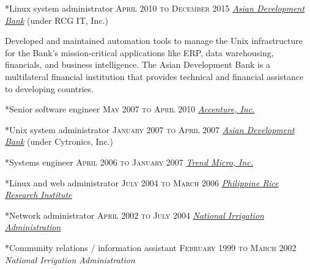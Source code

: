 \documentclass[10pt, a4paper, final]{article}
\begin{document}
\begin{minipage}[t]{0.65\linewidth}
\begin{section}
    \begin{subsection}*{Linux system administrator \hfill\textsc{April 2010 to December 2015}}
      \href{http://www.adb.org}{\textit{Asian Development Bank}} (under RCG IT, Inc.) 

      Developed and maintained automation tools to manage the Unix infrastructure for the Bank's mission-critical applications like ERP, data warehousing, financials, and business intelligence. The Asian Development Bank is a multilateral financial institution that provides technical and financial assistance to developing countries.
    \end{subsection}
    \vspace{1em}
  
    \begin{subsection}*{Senior software engineer \hfill\textsc{May 2007 to April 2010}}
      \href{http://www.accenture.com}{\textit{Accenture, Inc.}}  
    \end{subsection}
    \vspace{1em}
  
    \begin{subsection}*{Unix system administrator \hfill\textsc{January 2007 to April 2007}}
      \href{http://www.adb.org}{\textit{Asian Development Bank}} (under Cytronics, Inc.) 
    \end{subsection}
    \vspace{1em}
  
    \begin{subsection}*{Systems engineer \hfill\textsc{April 2006 to January 2007}}
      \href{http://www.trendmicro.com}{\textit{Trend Micro, Inc.}}  
    \end{subsection}
    \vspace{1em}
  
    \begin{subsection}*{Linux and web administrator \hfill\textsc{July 2004 to March 2006}}
      \href{http://www.philrice.gov.ph}{\textit{Philippine Rice Research Institute}}  
    \end{subsection}
    \vspace{1em}
  
    \begin{subsection}*{Network administrator \hfill\textsc{April 2002 to July 2004}}
      \href{http://www.nia.gov.ph}{\textit{National Irrigation Administration}}  
    \end{subsection}
    \vspace{1em}
  
    \begin{subsection}*{Community relations / information assistant \hfill\textsc{February 1999 to March 2002}}
      \textit{National Irrigation Administration} 
    \end{subsection}
    \vspace{1em}
  \end{section}
\end{minipage}
\end{document}
